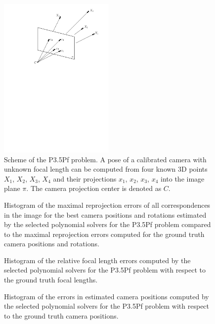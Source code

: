 \begin{figure}[ht]
  \centering
  \includegraphics[width=0.5\textwidth]{drawings/P35Pf.pdf}
  \caption{Scheme of the P3.5Pf problem. A pose of a calibrated camera with unknown focal length can be computed from four known 3D points $X_1$, $X_2$, $X_3$, $X_4$ and their projections $x_1$, $x_2$, $x_3$, $x_4$ into the image plane $\pi$. The camera projection center is denoted as $C$.}
\end{figure}

\begin{figure}[ht]
  \centering
  \resizebox{0.95\textwidth}{!}{}
  \caption{Histogram of the maximal reprojection errors of all correspondences in the image for the best camera positions and rotations estimated by the selected polynomial solvers for the P3.5Pf problem compared to the maximal reprojection errors computed for the ground truth camera positions and rotations.}
\end{figure}

\begin{figure}[ht]
  \centering
  \resizebox{0.95\textwidth}{!}{}
  \caption{Histogram of the relative focal length errors computed by the selected polynomial solvers for the P3.5Pf problem with respect to the ground truth focal lengths.}
\end{figure}

\begin{figure}[ht]
  \centering
  \resizebox{0.95\textwidth}{!}{}
  \caption{Histogram of the errors in estimated camera positions computed by the selected polynomial solvers for the P3.5Pf problem with respect to the ground truth camera positions.}
\end{figure}

